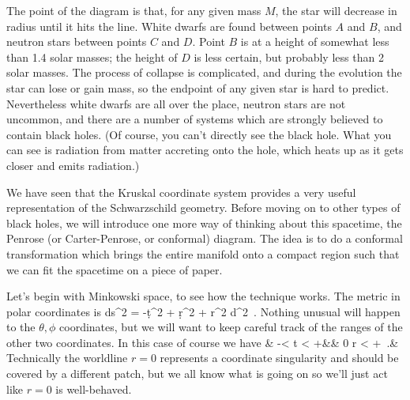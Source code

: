 \documentclass[12pt]{article}
\begin{document}
\noindent The point of the diagram is that, for any given mass $M$,
the star will decrease in radius until it hits the line.  White
dwarfs are found between points $A$ and $B$, and neutron stars 
between points $C$ and $D$.  Point $B$ is at a height of somewhat less
than 1.4 solar masses; the height of $D$ is less certain, but probably
less than 2 solar masses.  The process of collapse is complicated, and
during the evolution the star can lose or gain mass, so the endpoint
of any given star is hard to predict.  Nevertheless white dwarfs are
all over the place, neutron stars are not uncommon, and there are a
number of systems which are strongly believed to contain black holes.
(Of course, you can't directly see the black hole.  What you can see
is radiation from matter accreting onto the hole, which heats up as
it gets closer and emits radiation.)

We have seen that the Kruskal coordinate system provides a very
useful representation of the Schwarzschild geometry.  Before moving
on to other types of black holes, we will introduce one more
way of thinking about this spacetime, the Penrose (or Carter-Penrose,
or conformal) diagram.  The idea is to do a conformal transformation
which brings the entire manifold onto a compact region such that we
can fit the spacetime on a piece of paper.

Let's begin with Minkowski space, to see how the technique works.
The metric in polar coordinates is
\be
  ds^2 = -\d t^2 + \d r^2 + r^2 d\Omega^2\ .\label{7.86}
\ee
Nothing unusual will happen to the $\theta, \phi$ coordinates, but
we will want to keep careful track of the ranges of the other two
coordinates.  In this case of course we have 
\bea
  & -\infty < t < +\infty&\cr& 0 \leq r < +\infty\ .&
  \label{7.87}
\eea
Technically the worldline $r=0$ represents a coordinate singularity
and should be covered by a different patch, but we all know what is
going on so we'll just act like $r=0$ is well-behaved.
\end{document}
